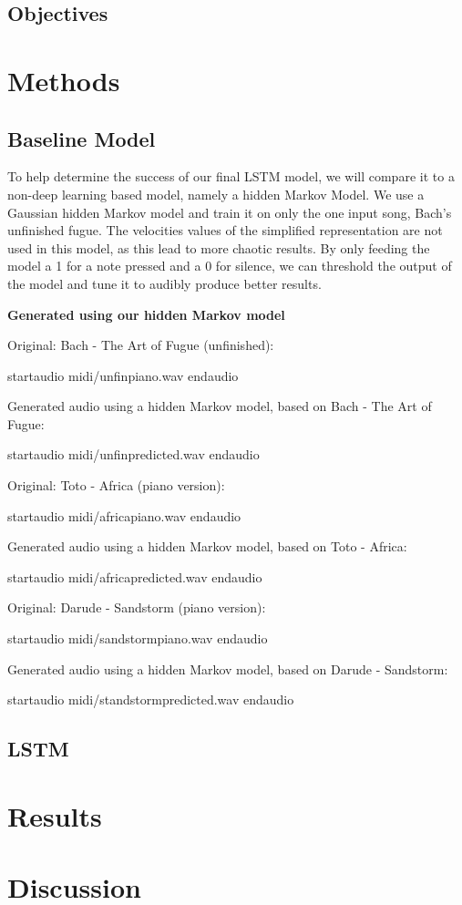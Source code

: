 \documentclass[11pt, twocolumn]{article}
\begin{document}
\subsection{Objectives}


\section{Methods}

\subsection{Baseline Model}
To help determine the success of our final LSTM model, we will compare it to a non-deep learning based model, namely a hidden Markov Model. We use a Gaussian hidden Markov model and train it on only the one input song, Bach's unfinished fugue. The velocities values of the simplified representation are not used in this model, as this lead to more chaotic results. By only feeding the model a 1 for a note pressed and a 0 for silence, we can threshold the output of the model and tune it to audibly produce better results.

\ifpdf
\else
\textbf{Generated using our hidden Markov model}

Original: Bach - The Art of Fugue (unfinished):

startaudio midi/unfinpiano.wav endaudio

Generated audio using a hidden Markov model, based on Bach - The Art of Fugue:

startaudio midi/unfinpredicted.wav endaudio

Original: Toto - Africa (piano version):

startaudio midi/africapiano.wav endaudio

Generated audio using a hidden Markov model, based on Toto - Africa:

startaudio midi/africapredicted.wav endaudio

Original: Darude - Sandstorm (piano version):

startaudio midi/sandstormpiano.wav endaudio

Generated audio using a hidden Markov model, based on Darude - Sandstorm:

startaudio midi/standstormpredicted.wav endaudio
\fi

\subsection{LSTM}

\lipsum[1-5]


\section{Results}
\section{Discussion}
 



\end{document}
